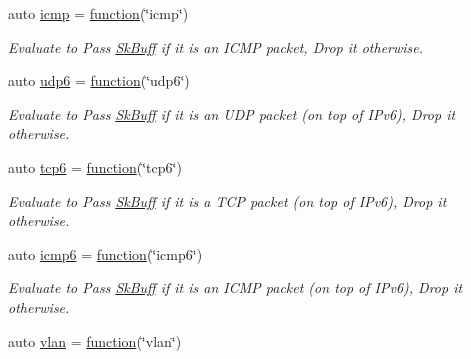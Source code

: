 \begin{DoxyCompactItemize}
auto \hyperlink{namespacepfq_1_1lang_1_1anonymous__namespace_02default_8hpp_03_a3becf93771a800904f002e39b1cc388f}{icmp} = \hyperlink{namespacepfq_1_1lang_a1a4638059d700ae08d0ca63886ff2bb3}{function}(\char`\"{}icmp\char`\"{})
\begin{DoxyCompactList}\small\item\em Evaluate to {\ttfamily Pass} \hyperlink{structpfq_1_1lang_1_1SkBuff}{Sk\+Buff} if it is an I\+C\+MP packet, {\ttfamily Drop} it otherwise. \end{DoxyCompactList}\item 
auto \hyperlink{namespacepfq_1_1lang_1_1anonymous__namespace_02default_8hpp_03_a37f7f4eb5cff8508b956eba7dee75a45}{udp6} = \hyperlink{namespacepfq_1_1lang_a1a4638059d700ae08d0ca63886ff2bb3}{function}(\char`\"{}udp6\char`\"{})
\begin{DoxyCompactList}\small\item\em Evaluate to {\ttfamily Pass} \hyperlink{structpfq_1_1lang_1_1SkBuff}{Sk\+Buff} if it is an U\+DP packet (on top of I\+Pv6), {\ttfamily Drop} it otherwise. \end{DoxyCompactList}\item 
auto \hyperlink{namespacepfq_1_1lang_1_1anonymous__namespace_02default_8hpp_03_ad5806a9b77c5975d08f0d0d317faa7a0}{tcp6} = \hyperlink{namespacepfq_1_1lang_a1a4638059d700ae08d0ca63886ff2bb3}{function}(\char`\"{}tcp6\char`\"{})
\begin{DoxyCompactList}\small\item\em Evaluate to {\ttfamily Pass} \hyperlink{structpfq_1_1lang_1_1SkBuff}{Sk\+Buff} if it is a T\+CP packet (on top of I\+Pv6), {\ttfamily Drop} it otherwise. \end{DoxyCompactList}\item 
auto \hyperlink{namespacepfq_1_1lang_1_1anonymous__namespace_02default_8hpp_03_a8fda9498af823eec4f9f8d81d4a171d5}{icmp6} = \hyperlink{namespacepfq_1_1lang_a1a4638059d700ae08d0ca63886ff2bb3}{function}(\char`\"{}icmp6\char`\"{})
\begin{DoxyCompactList}\small\item\em Evaluate to {\ttfamily Pass} \hyperlink{structpfq_1_1lang_1_1SkBuff}{Sk\+Buff} if it is an I\+C\+MP packet (on top of I\+Pv6), {\ttfamily Drop} it otherwise. \end{DoxyCompactList}\item 
auto \hyperlink{namespacepfq_1_1lang_1_1anonymous__namespace_02default_8hpp_03_a747e907a678ad69c5bfdd3048a239b6a}{vlan} = \hyperlink{namespacepfq_1_1lang_a1a4638059d700ae08d0ca63886ff2bb3}{function}(\char`\"{}vlan\char`\"{})

\end{DoxyCompactItemize}
